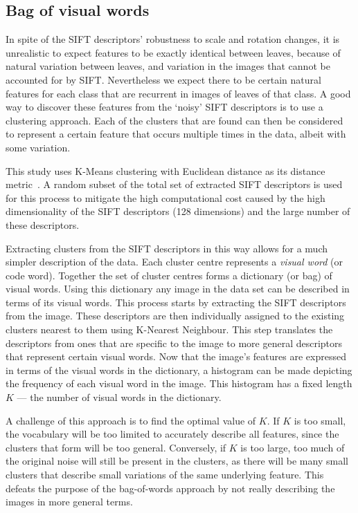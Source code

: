 
\subsection{Bag of visual words}
In spite of the SIFT descriptors' robustness to scale and rotation changes, it is unrealistic to expect features to be exactly identical between leaves, because of natural variation between leaves, and variation in the images that cannot be accounted for by SIFT.
Nevertheless we expect there to be certain natural features for each class that are recurrent in images of leaves of that class.
A good way to discover these features from the `noisy' SIFT descriptors is to use a clustering approach.
Each of the clusters that are found can then be considered to represent a certain feature that occurs multiple times in the data, albeit with some variation.

This study uses K-Means clustering with Euclidean distance as its distance metric~\cite{macqueen1967}.
A random subset of the total set of extracted SIFT descriptors is used for this process to mitigate the high computational cost caused by the high dimensionality of the SIFT descriptors (128 dimensions) and the large number of these descriptors.

Extracting clusters from the SIFT descriptors in this way allows for a much simpler description of the data.
Each cluster centre represents a \emph{visual word} (or code word).
Together the set of cluster centres forms a dictionary (or bag) of visual words.
Using this dictionary any image in the data set can be described in terms of its visual words.
This process starts by extracting the SIFT descriptors from the image.
These descriptors are then individually assigned to the existing clusters nearest to them using K-Nearest Neighbour.
This step translates the descriptors from ones that are specific to the image to more general descriptors that represent certain visual words.
Now that the image's features are expressed in terms of the visual words in the dictionary, a histogram can be made depicting the frequency of each visual word in the image.
This histogram has a fixed length $K$ --- the number of visual words in the dictionary.

A challenge of this approach is to find the optimal value of $K$.
If $K$ is too small, the vocabulary will be too limited to accurately describe all features, since the clusters that form will be too general.
Conversely, if $K$ is too large, too much of the original noise will still be present in the clusters, as there will be many small clusters that describe small variations of the same underlying feature. 
This defeats the purpose of the bag-of-words approach by not really describing the images in more general terms.

